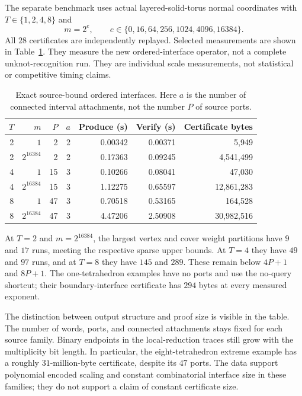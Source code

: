 The separate benchmark uses actual layered-solid-torus normal coordinates
with $T\in\{1,2,4,8\}$ and
\[
                    m=2^e,\qquad
                    e\in\{0,16,64,256,1024,4096,16384\}.
\]
All $28$ certificates are independently replayed.  Selected measurements
are shown in Table~\ref{int:timings}.  They measure the new ordered-interface
operator, not a complete unknot-recognition run.  They are individual scale
measurements, not statistical or competitive timing claims.

\begin{table}[htbp]
\centering
\small
\begin{tabular}{rrrrrrr}
\hline
$T$ & $m$ & $P$ & $a$ & Produce (s) & Verify (s) & Certificate bytes \\
\hline
2 & $1$ & 2 & 2 & 0.00342 & 0.00371 & 5,949 \\
2 & $2^{16384}$ & 2 & 2 & 0.17363 & 0.09245 & 4,541,499 \\
4 & $1$ & 15 & 3 & 0.10266 & 0.08041 & 47,030 \\
4 & $2^{16384}$ & 15 & 3 & 1.12275 & 0.65597 & 12,861,283 \\
8 & $1$ & 47 & 3 & 0.70518 & 0.53165 & 164,528 \\
8 & $2^{16384}$ & 47 & 3 & 4.47206 & 2.50908 & 30,982,516 \\
\hline
\end{tabular}
\caption{Exact source-bound ordered interfaces.  Here $a$ is the number of
connected interval attachments, not the number $P$ of source ports.}
\label{int:timings}
\end{table}

At $T=2$ and $m=2^{16384}$, the largest vertex and cover weight partitions
have $9$ and $17$ runs, meeting the respective sparse upper bounds.  At
$T=4$ they have $49$ and $97$ runs, and at $T=8$ they have $145$ and $289$.
These remain below $4P+1$ and $8P+1$.  The one-tetrahedron examples have
no ports and use the no-query shortcut; their boundary-interface certificate
has $294$ bytes at every measured exponent.

The distinction between output structure and proof size is visible in the
table.  The number of words, ports, and connected attachments stays fixed
for each source family.  Binary endpoints in the local-reduction traces
still grow with the multiplicity bit length.  In particular, the
eight-tetrahedron extreme example has a roughly $31$-million-byte
certificate, despite its $47$ ports.  The data support polynomial encoded
scaling and constant combinatorial interface size in these families; they
do not support a claim of constant certificate size.

